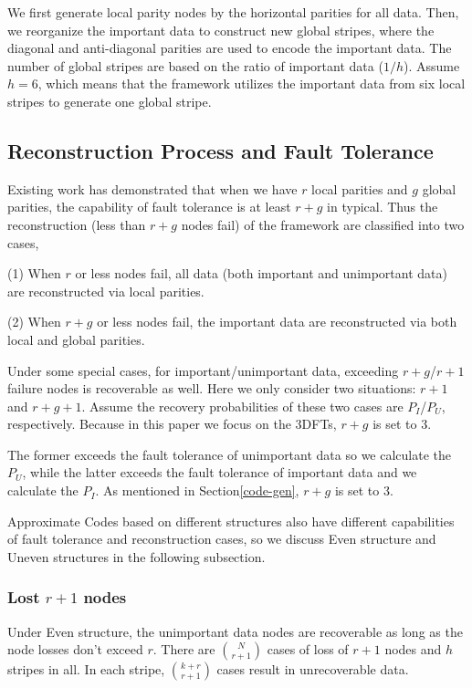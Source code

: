 \documentclass[sigconf]{acmart}
\begin{document}
We first generate local parity nodes by the horizontal parities for all data. Then, we reorganize the important data to construct new global stripes, where the diagonal and anti-diagonal parities are used to encode the important data. The number of global stripes are based on the ratio of important data ($1/h$). Assume $h=6$, which means that the framework utilizes the important data from six local stripes to generate one global stripe.


\subsection{Reconstruction Process and Fault Tolerance}\label{ReconstructionFT}
Existing work \cite{LRC} has demonstrated that when we have $r$ local parities and $g$ global parities, the capability of fault tolerance is at least $r+g$ in typical. Thus the reconstruction (less than $r+g$ nodes fail) of the framework are classified into two cases,

(1) When $r$ or less nodes fail, all data (both important and unimportant data) are reconstructed via local parities.

(2) When $r+g$ or less nodes fail, the important data are reconstructed via both local and global parities.

Under some special cases, for important/unimportant data, exceeding $r+g$/$r+1$ failure nodes is recoverable as well. 
Here we only consider two situations: $r+1$ and $r+g+1$. Assume the recovery probabilities of these two cases are $P_{I}$/$P_{U}$, respectively. Because in this paper we focus on the 3DFTs, $r+g$ is set to 3.

The former exceeds the fault tolerance of unimportant data so we calculate the $P_{U}$, while the latter exceeds the fault tolerance of important data and we calculate the $P_{I}$.
As mentioned in Section\ref{code-gen}, $r+g$ is set to 3.

Approximate Codes based on different structures also have different capabilities of fault tolerance and reconstruction cases, so we discuss Even structure and Uneven structures in the following subsection.

\subsubsection{Lost $r+1$ nodes}
Under Even structure, the unimportant data nodes are recoverable as long as the node losses don't exceed $r$.
There are $\binom{N}{r+1}$ cases of loss of $r+1$ nodes and $h$ stripes in all. In each stripe, $\binom{k+r}{r+1}$ cases result in unrecoverable data.
\end{document}

